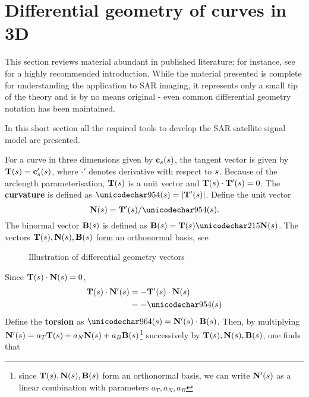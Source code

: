 \section{Differential geometry of curves in 3D}
\label{sc:diffgeoreview}
This section reviews material abundant in published literature; for instance, see \cite{WoodDiffGeo} for a highly recommended introduction. While the material presented is complete for understanding the application to SAR imaging, it represents only a small tip of the theory and is by no means original - even common differential geometry notation has been maintained.
\par
In this short section all the required tools to develop the SAR satellite signal model are presented.
\par
For a curve in three dimensions given by $\mathbf{c}_s(s)$, the tangent vector is given by $\mathbf{T}(s) = \mathbf{c}_s'(s)$, where $\cdot'$ denotes derivative with respect to $s$. Because of the arclength parameterisation, $\mathbf{T}(s)$ is a unit vector and $\mathbf{T}(s)\cdot\mathbf{T}'(s)=0$. The \textbf{curvature} is defined as $\kappa(\parm) =\lvert\vct{T}'(\parm)\rvert$. Define the unit vector 
\begin{equation}
\vct{N}(\parm) = \vct{T}'(\parm)/\kappa(\parm). 
\end{equation}
The binormal vector $\mathbf{B}(s)$ is defined as $\vct{B}(\parm) = \vct{T}(\parm)\times\vct{N}(\parm)$. The vectors $\mathbf{T}(s), \mathbf{N}(s), \mathbf{B}(s)$ form an orthonormal basis, see 
\begin{figure}[ht!]
    \begin{center}
    \resizebox{0.8\textwidth}{!}{}
	\caption{Illustration of differential geometry vectors}
	\label{fg:diffvectors}
	\end{center}
\end{figure}
\par
Since $\mathbf{T}(s)\cdot\mathbf{N}(s)=0$,
\begin{equation}
\begin{split}
 \vct{T}(\parm)\cdot\vct{N}'(\parm)&=-\vct{T}'(\parm)\cdot\vct{N}(\parm)\\
 &=-\kappa(\parm)
\end{split}
\end{equation}
Define the \textbf{torsion} as $\tau(\parm) = \vct{N}'(\parm)\cdot\vct{B}(\parm)$. Then, by multiplying $\mathbf{N}'(s)=a_T\mathbf{T}(s) + a_N\mathbf{N}(s) + a_B\mathbf{B}(s)$\footnote{since $\mathbf{T}(s), \mathbf{N}(s), \mathbf{B}(s)$ form an orthonormal basis, we can write $\mathbf{N}'(s)$ as a linear combination with parameters $a_T, a_N, a_B$} successively by $\mathbf{T}(s),\mathbf{N}(s),\mathbf{B}(s)$, one finds that
